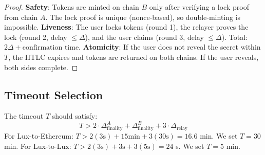 \begin{proof}
\textbf{Safety}: Tokens are minted on chain $B$ only after verifying a lock proof from chain $A$. The lock proof is unique (nonce-based), so double-minting is impossible. \textbf{Liveness}: The user locks tokens (round 1), the relayer proves the lock (round 2, delay $\leq \Delta$), and the user claims (round 3, delay $\leq \Delta$). Total: $2\Delta + \text{confirmation time}$. \textbf{Atomicity}: If the user does not reveal the secret within $T$, the HTLC expires and tokens are returned on both chains. If the user reveals, both sides complete.
\end{proof}

\subsection{Timeout Selection}

\begin{proposition}
The timeout $T$ should satisfy:
\begin{equation}
    T > 2 \cdot \Delta_{\text{finality}}^A + \Delta_{\text{finality}}^B + 3 \cdot \Delta_{\text{relay}}
\end{equation}
For Lux-to-Ethereum: $T > 2(3\text{s}) + 15\text{min} + 3(30\text{s}) = 16.6$ min. We set $T = 30$ min.
For Lux-to-Lux: $T > 2(3\text{s}) + 3\text{s} + 3(5\text{s}) = 24$ s. We set $T = 5$ min.
\end{proposition}

